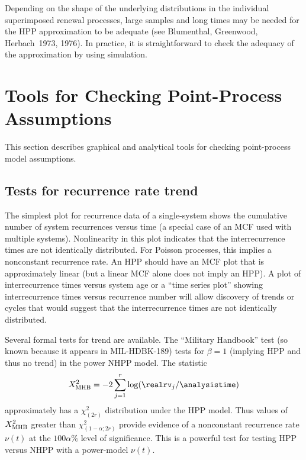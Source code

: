 Depending on the shape of the underlying distributions in the
individual superimposed
renewal processes, large samples and long times may be needed for
the HPP approximation to be adequate (see Blumenthal, Greenwood,
Herbach~1973, 1976). In practice, it is
straightforward to check the adequacy of the approximation by using
simulation.

\section{Tools for Checking Point-Process Assumptions}
\label{section:check.point.process}
This section describes graphical and analytical tools for
checking point-process model assumptions.

\subsection{Tests for recurrence rate trend}
The simplest plot for recurrence data of a single-system shows the
cumulative number of system recurrences versus time (a special case
of an MCF used with multiple systems).  Nonlinearity in this plot
indicates that the interrecurrence times are not identically
distributed. For Poisson processes, this implies a nonconstant
recurrence rate. An HPP should have an MCF plot that is
approximately linear (but a linear MCF alone does not imply an
HPP). A plot of interrecurrence times versus system age or a ``time
series plot'' showing interrecurrence times versus recurrence
number will allow discovery of trends or cycles that would suggest
that the interrecurrence times are not identically distributed.

Several formal tests for trend are available.  The ``Military
Handbook'' test (so known because it appears in MIL-HDBK-189) tests
for $\beta=1$ (implying HPP and thus no trend) in the power NHPP
model.  The statistic
\begin{eqnarray*}
X^{2}_{\rm MHB}= -2 \sum_{j=1}^{r} \log(\realrv_{j}/\analysistime)
\end{eqnarray*}
approximately has a $\chi^{2}_{(2r)}$ distribution under the HPP model.  Thus
values of $X^{2}_{\rm MHB}$ greater than $\chi^{2}_{(1-\alpha;2r)}$
provide evidence of a nonconstant recurrence rate $\nu(t)$ at the
$100 \alpha \%$ level of significance.  This is a powerful test for
testing HPP versus NHPP with a power-model $\nu(t)$.


